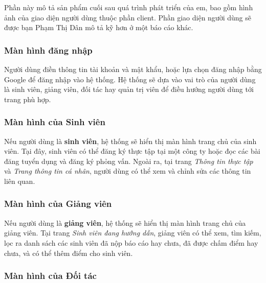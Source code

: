 \documentclass[./../main.tex]{subfiles}
\begin{document}
Phần này mô tả sản phẩm cuối sau quá trình phát triển của em, bao gồm
hình ảnh của giao diện người dùng thuộc phần client. Phần giao diện
người dùng sẽ được bạn Phạm Thị Dân mô tả kỹ hơn ở một báo cáo khác.

\subsubsection{Màn hình đăng nhập}


Người dùng điền thông tin tài khoản và mật khẩu, hoặc lựa chọn đăng nhập
bằng Google để đăng nhập vào hệ thống. Hệ thống sẽ dựa vào vai trò của
người dùng là sinh viên, giảng viên, đối tác hay quản trị viên để điều
hướng người dùng tới trang phù hợp.

\subsubsection{Màn hình của Sinh viên}

Nếu người dùng là \textbf{sinh viên}, hệ thống sẽ hiển thị màn hình
trang chủ của sinh viên. Tại đây, sinh viên có thể đăng ký thực tập tại
một công ty hoặc đọc các bài đăng tuyển dụng và đăng ký phỏng vấn. Ngoài
ra, tại trang \emph{Thông tin thực tập} và \emph{Trang thông tin cá
nhân}, người dùng có thể xem và chỉnh sửa các thông tin liên quan.

\subsubsection{Màn hình của Giảng viên}


Nếu người dùng là \textbf{giảng viên}, hệ thống sẽ hiển thị màn hình
trang chủ của giảng viên. Tại trang \emph{Sinh viên đang hướng dẫn},
giảng viên có thể xem, tìm kiếm, lọc ra danh sách các sinh viên đã nộp
báo cáo hay chưa, đã được chấm điểm hay chưa, và có thể thêm điểm cho
sinh viên.

\subsubsection{Màn hình của Đối tác}

\end{document}

